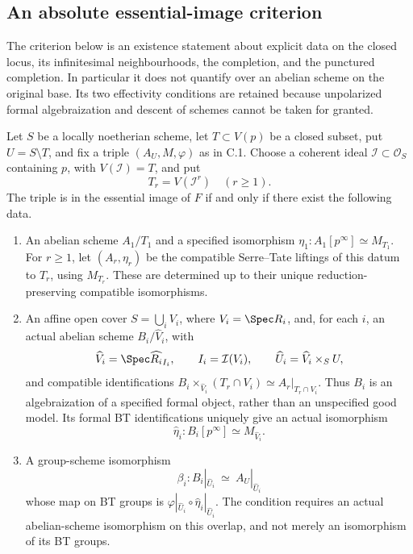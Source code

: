 \subsection{An absolute essential-image criterion}

The criterion below is an existence statement about explicit data on
the closed locus, its infinitesimal neighbourhoods, the completion,
and the punctured completion. In particular it does not quantify over
an abelian scheme on the original base. Its two effectivity conditions
are retained because unpolarized formal algebraization and descent of
schemes cannot be taken for granted.

\begin{theorem}
\label{thm:C-RD13}
Let $S$ be a locally noetherian scheme, let $T\subset V(p)$ be a closed subset,
put $U=S\setminus T$, and fix a triple $(A_U,M,\varphi)$ as in C.1.
Choose a coherent ideal $\mathcal I\subset\mathcal O_S$ containing
$p$, with $V(\mathcal I)=T$, and put
\[
 T_r=V(\mathcal I^r)\quad(r\geq1).
\]
The triple is in the essential image of $F$ if and only if there
exist the following data.

\begin{enumerate}
\item An abelian scheme $A_1/T_1$ and a specified isomorphism
$\eta_1:A_1[p^\infty]\simeq M_{T_1}$.
For $r\geq1$, let $(A_r,\eta_r)$ be the compatible Serre--Tate
liftings of this datum to $T_r$, using $M_{T_r}$. These are determined
up to their unique reduction-preserving compatible isomorphisms.

\item An affine open cover $S=\bigcup_i V_i$, where
$V_i=\Spec R_i$, and, for each $i$, an actual abelian scheme
$B_i/\widehat V_i$, with
\[
 \widehat V_i=\Spec\widehat{R_i}_{I_i},\qquad
 I_i=\mathcal I(V_i),\qquad
 \widehat U_i=\widehat V_i\times_SU,
\]
and compatible identifications
$B_i\times_{\widehat V_i}(T_r\cap V_i)\simeq A_r|_{T_r\cap V_i}$.
Thus $B_i$ is an algebraization of a specified formal object, rather
than an unspecified good model. Its formal BT identifications
uniquely give an actual isomorphism
\[
 \widehat\eta_i:B_i[p^\infty]\simeq M_{\widehat V_i}.
                                                        \tag{C-RD13.1}
\]

\item A group-scheme isomorphism
\[
 \beta_i:B_i|_{\widehat U_i}\ \simeq\ A_U|_{\widehat U_i}
                                                        \tag{C-RD13.2}
\]
whose map on BT groups is
$\varphi|_{\widehat U_i}\circ\widehat\eta_i|_{\widehat U_i}$.
The condition requires an actual abelian-scheme isomorphism on this
overlap, and not merely an isomorphism of its BT groups.


\end{enumerate}
\end{theorem}
